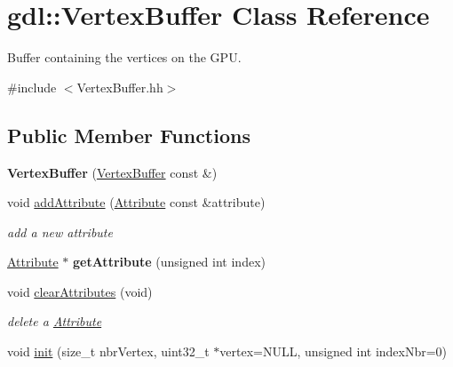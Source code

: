 \hypertarget{classgdl_1_1_vertex_buffer}{\section{gdl\-:\-:Vertex\-Buffer Class Reference}
\label{classgdl_1_1_vertex_buffer}
}


Buffer containing the vertices on the G\-P\-U.  




{\ttfamily \#include $<$Vertex\-Buffer.\-hh$>$}

\subsection*{Public Member Functions}
\begin{DoxyCompactItemize}
\item 
\hypertarget{classgdl_1_1_vertex_buffer_acdce555835737ee9ade12a348cdc99ec}{{\bfseries Vertex\-Buffer} (\hyperlink{classgdl_1_1_vertex_buffer}{Vertex\-Buffer} const \&)}\label{classgdl_1_1_vertex_buffer_acdce555835737ee9ade12a348cdc99ec}

\item 
\hypertarget{classgdl_1_1_vertex_buffer_aba6199097912b1dfd9a52c82479a116b}{void \hyperlink{classgdl_1_1_vertex_buffer_aba6199097912b1dfd9a52c82479a116b}{add\-Attribute} (\hyperlink{structgdl_1_1_attribute}{Attribute} const \&attribute)}\label{classgdl_1_1_vertex_buffer_aba6199097912b1dfd9a52c82479a116b}

\begin{DoxyCompactList}\small\item\em add a new attribute \end{DoxyCompactList}\item 
\hypertarget{classgdl_1_1_vertex_buffer_ab23d158a6d67679c2542418e82fb923f}{\hyperlink{structgdl_1_1_attribute}{Attribute} $\ast$ {\bfseries get\-Attribute} (unsigned int index)}\label{classgdl_1_1_vertex_buffer_ab23d158a6d67679c2542418e82fb923f}

\item 
\hypertarget{classgdl_1_1_vertex_buffer_a7b9273feec2c8742b4c1622f84d851fd}{void \hyperlink{classgdl_1_1_vertex_buffer_a7b9273feec2c8742b4c1622f84d851fd}{clear\-Attributes} (void)}\label{classgdl_1_1_vertex_buffer_a7b9273feec2c8742b4c1622f84d851fd}

\begin{DoxyCompactList}\small\item\em delete a \hyperlink{structgdl_1_1_attribute}{Attribute} \end{DoxyCompactList}\item 
\hypertarget{classgdl_1_1_vertex_buffer_aab83fc1ecdeba2031171c06988fc8f28}{void \hyperlink{classgdl_1_1_vertex_buffer_aab83fc1ecdeba2031171c06988fc8f28}{init} (size\-\_\-t nbr\-Vertex, uint32\-\_\-t $\ast$vertex=N\-U\-L\-L, unsigned int index\-Nbr=0)}\label{classgdl_1_1_vertex_buffer_aab83fc1ecdeba2031171c06988fc8f28}


\end{DoxyCompactItemize}
